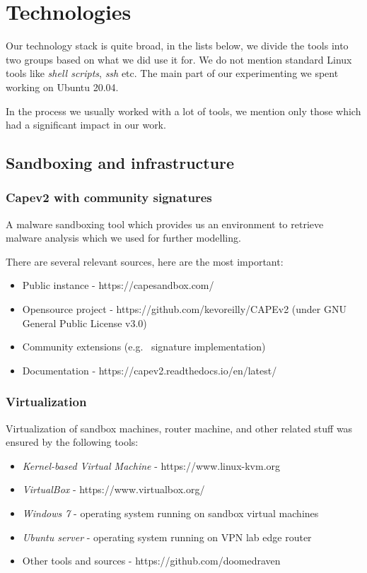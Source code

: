 \chapter{Technologies} \label{app:technologies}
Our technology stack is quite broad, in the lists below, we divide the tools into two groups based on what we did use it for. We do not mention standard Linux tools like \emph{shell scripts}, \emph{ssh} etc. The main part of our experimenting we spent working on Ubuntu 20.04.

In the process we usually worked with a lot of tools, we mention only those which had a significant impact in our work.


\section*{Sandboxing and infrastructure}
\subsection*{Capev2 with community signatures}
A malware sandboxing tool which provides us an environment to retrieve malware analysis which we used for further modelling. 

There are several relevant sources, here are the most important:
\begin{itemize}
  \itemsep0em 
  \item Public instance - https://capesandbox.com/
  \item Opensource project -  https://github.com/kevoreilly/CAPEv2 (under GNU General Public License v3.0)
  \item Community extensions (e.g. \ signature implementation)
  \item Documentation - https://capev2.readthedocs.io/en/latest/
\end{itemize}

\subsection*{Virtualization}
Virtualization of sandbox machines, router machine, and other related stuff was ensured by the following tools:
\begin{itemize}
  \itemsep0em 
  \item \emph{Kernel-based Virtual Machine} - https://www.linux-kvm.org
  \item \emph{VirtualBox} - https://www.virtualbox.org/
  \item \emph{Windows 7} - operating system running on sandbox virtual machines
  \item \emph{Ubuntu server} - operating system running on VPN lab edge router
  \item Other tools and sources - https://github.com/doomedraven
\end{itemize}

